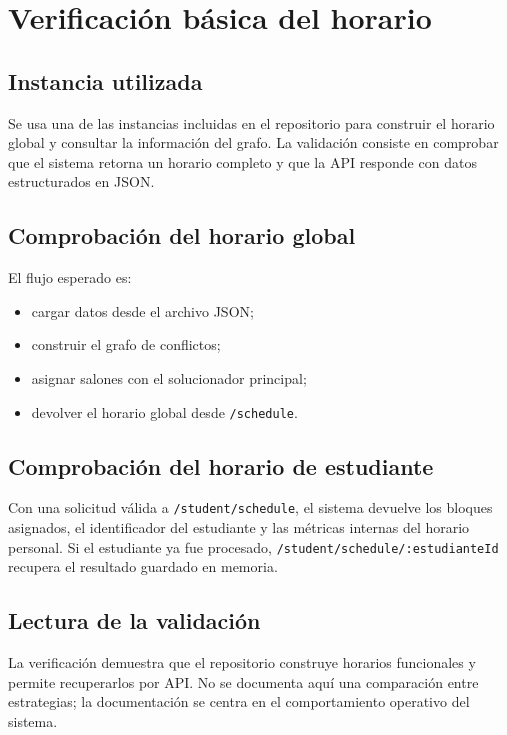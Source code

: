 \chapter{Verificación básica del horario}

\section{Instancia utilizada}

Se usa una de las instancias incluidas en el repositorio para construir el horario global y consultar la información del grafo. La validación consiste en comprobar que el sistema retorna un horario completo y que la API responde con datos estructurados en JSON.

\section{Comprobación del horario global}

El flujo esperado es:
\begin{itemize}[leftmargin=1.5cm]
  \item cargar datos desde el archivo JSON;
  \item construir el grafo de conflictos;
  \item asignar salones con el solucionador principal;
  \item devolver el horario global desde \texttt{/schedule}.
\end{itemize}

\section{Comprobación del horario de estudiante}

Con una solicitud válida a \texttt{/student/schedule}, el sistema devuelve los bloques asignados, el identificador del estudiante y las métricas internas del horario personal. Si el estudiante ya fue procesado, \texttt{/student/schedule/:estudianteId} recupera el resultado guardado en memoria.

\section{Lectura de la validación}

La verificación demuestra que el repositorio construye horarios funcionales y permite recuperarlos por API. No se documenta aquí una comparación entre estrategias; la documentación se centra en el comportamiento operativo del sistema.
